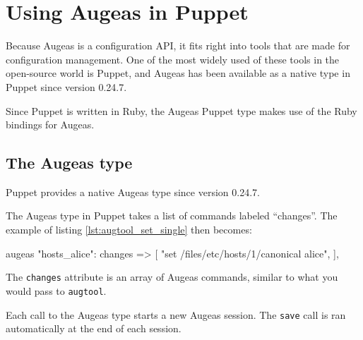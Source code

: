 \chapter{Using Augeas in Puppet}


Because Augeas is a configuration API, it fits right into tools that are made for configuration management. One of the most widely used of these tools in the open-source world is Puppet, and Augeas has been available as a native type in Puppet since version 0.24.7.

Since Puppet is written in Ruby, the Augeas Puppet type makes use of the Ruby bindings for Augeas.

\section{The Augeas type}

Puppet provides a native Augeas type since version 0.24.7.

 The Augeas type in Puppet takes a list of commands labeled ``changes''. The example of listing \ref{lst:augtool_set_single} then becomes:

\begin{puppet-augeas}[]
augeas { "hosts_alice":
   changes => [
      "set /files/etc/hosts/1/canonical alice",
   ],
}
\end{puppet-augeas}

The \verb!changes! attribute is an array of Augeas commands, similar to what you would pass to \verb!augtool!.

\begin{quote}

\end{quote}
 Each call to the Augeas type starts a new Augeas session. The \verb!save! call is ran automatically at the end of each session.

